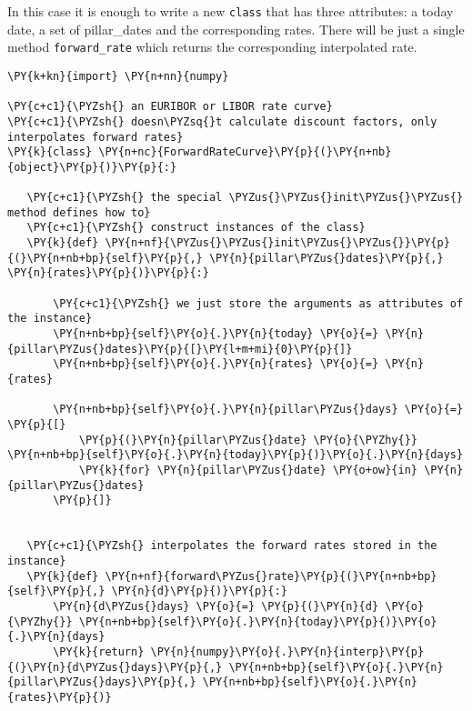 \begin{Answer}
In this case it is enough to write a new \texttt{class} that has three
attributes: a today date, a set of pillar\_dates and the corresponding
rates. There will be just a single method \texttt{forward\_rate} which
returns the corresponding interpolated rate.

\begin{tcolorbox}[size=fbox, boxrule=1pt, colback=cellbackground, colframe=cellborder]
\begin{Verbatim}[commandchars=\\\{\}]
\PY{k+kn}{import} \PY{n+nn}{numpy}
        
\PY{c+c1}{\PYZsh{} an EURIBOR or LIBOR rate curve}
\PY{c+c1}{\PYZsh{} doesn\PYZsq{}t calculate discount factors, only interpolates forward rates}
\PY{k}{class} \PY{n+nc}{ForwardRateCurve}\PY{p}{(}\PY{n+nb}{object}\PY{p}{)}\PY{p}{:}
   
   \PY{c+c1}{\PYZsh{} the special \PYZus{}\PYZus{}init\PYZus{}\PYZus{} method defines how to}
   \PY{c+c1}{\PYZsh{} construct instances of the class}
   \PY{k}{def} \PY{n+nf}{\PYZus{}\PYZus{}init\PYZus{}\PYZus{}}\PY{p}{(}\PY{n+nb+bp}{self}\PY{p}{,} \PY{n}{pillar\PYZus{}dates}\PY{p}{,} \PY{n}{rates}\PY{p}{)}\PY{p}{:}
       
       \PY{c+c1}{\PYZsh{} we just store the arguments as attributes of the instance}
       \PY{n+nb+bp}{self}\PY{o}{.}\PY{n}{today} \PY{o}{=} \PY{n}{pillar\PYZus{}dates}\PY{p}{[}\PY{l+m+mi}{0}\PY{p}{]}
       \PY{n+nb+bp}{self}\PY{o}{.}\PY{n}{rates} \PY{o}{=} \PY{n}{rates}
       
       \PY{n+nb+bp}{self}\PY{o}{.}\PY{n}{pillar\PYZus{}days} \PY{o}{=} \PY{p}{[}
           \PY{p}{(}\PY{n}{pillar\PYZus{}date} \PY{o}{\PYZhy{}} \PY{n+nb+bp}{self}\PY{o}{.}\PY{n}{today}\PY{p}{)}\PY{o}{.}\PY{n}{days}
           \PY{k}{for} \PY{n}{pillar\PYZus{}date} \PY{o+ow}{in} \PY{n}{pillar\PYZus{}dates}
       \PY{p}{]}
       
       
   \PY{c+c1}{\PYZsh{} interpolates the forward rates stored in the instance}
   \PY{k}{def} \PY{n+nf}{forward\PYZus{}rate}\PY{p}{(}\PY{n+nb+bp}{self}\PY{p}{,} \PY{n}{d}\PY{p}{)}\PY{p}{:}
       \PY{n}{d\PYZus{}days} \PY{o}{=} \PY{p}{(}\PY{n}{d} \PY{o}{\PYZhy{}} \PY{n+nb+bp}{self}\PY{o}{.}\PY{n}{today}\PY{p}{)}\PY{o}{.}\PY{n}{days}
       \PY{k}{return} \PY{n}{numpy}\PY{o}{.}\PY{n}{interp}\PY{p}{(}\PY{n}{d\PYZus{}days}\PY{p}{,} \PY{n+nb+bp}{self}\PY{o}{.}\PY{n}{pillar\PYZus{}days}\PY{p}{,} \PY{n+nb+bp}{self}\PY{o}{.}\PY{n}{rates}\PY{p}{)}
\end{Verbatim}
\end{tcolorbox}
\end{Answer}


  
